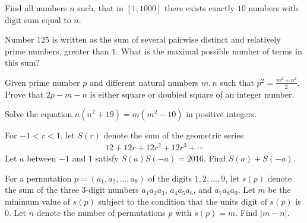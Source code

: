 \documentclass[problems.tex]{subfile}
\begin{document}
	\begin{problem}
		Find all numbers $n$ such, that in $[1;1000]$ there exists exactly $10$ numbers with digit sum equal to $n$. %
	\end{problem}

	\begin{problem}
		Number $125$ is written as the sum of several pairwise distinct and relatively prime numbers, greater than $1$. What is the maximal possible number of terms in this sum? %
	\end{problem}

	\begin{problem}
		Given prime number $p$ and different natural numbers $m, n$ such that $p^2=\frac{m^2+n^2}{2}$. Prove that $2p-m-n$ is either square or doubled square of an integer number. %
	\end{problem}

	\begin{problem}
		Solve the equation $n(n^2+19)=m(m^2-10)$ in positive integers. %
	\end{problem}

	\begin{problem}
		For $-1 < r < 1$, let $S(r)$ denote the sum of the geometric series
			\begin{align*}
				12 + 12r + 12r^2 + 12r^3 + \cdots
			\end{align*}
		Let $a$ between $-1$ and $1$ satisfy $S(a)S(-a)=2016$. Find $S(a) + S(-a)$. %
	\end{problem}

	\begin{problem}
		For a permutation $p = (a_1,a_2,\ldots,a_9)$ of the digits $1,2,\ldots,9$, let $s(p)$ denote the sum of the three $3$-digit numbers $a_1a_2a_3$, $a_4a_5a_6$, and $a_7a_8a_9$. Let $m$ be the minimum value of $s(p)$ subject to the condition that the units digit of $s(p)$ is $0$. Let $n$ denote the number of permutations $p$ with $s(p) = m$. Find $|m - n|$. %
	\end{problem}
\end{document}
